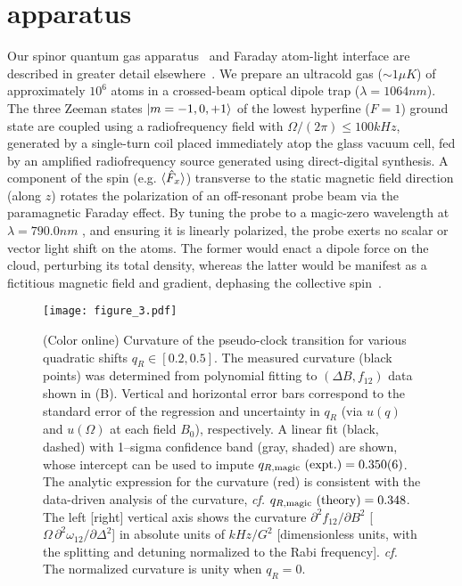 \documentclass[aps,prl,reprint,superscriptaddress,floatfix]{revtex4-1}
\begin{document}
\section{apparatus}
\label{sec:apparatus}
Our spinor quantum gas apparatus~\cite{wood_magnetic_2015} and Faraday atom-light interface are described in greater detail elsewhere~\cite{martijn_faraday_2017}.
We prepare an ultracold gas ($\sim1\unit{\mu K}$) of approximately $10^6$ \Rb atoms in a crossed-beam optical dipole trap ($\lambda=1064\unit{nm}$).
The three Zeeman states $\vert m=-1,0,+1 \rangle $ of the lowest hyperfine ($F=1$) ground state are coupled using a radiofrequency field with $\Omega/(2\pi) \leq 100\unit{kHz}$, generated by a single-turn coil placed immediately atop the glass vacuum cell, fed by an amplified radiofrequency source generated using direct-digital synthesis.
A component of the spin (e.g. $\langle \hat{F}_x \rangle$) transverse to the static magnetic field direction (along $z$) rotates the polarization of an off-resonant probe beam via the paramagnetic Faraday effect.
By tuning the probe to a magic-zero wavelength at $\lambda = 790.0\unit{nm}$ 
, and ensuring it is linearly polarized, the probe exerts no scalar or vector light shift on the atoms.
The former would enact a dipole force on the cloud, perturbing its total density, whereas the latter would be manifest as a fictitious magnetic field and gradient, dephasing the collective spin~\cite{wood_measurement_2016}.
\

\begin{figure}
    \centering
    \texttt{[image: figure\_3.pdf]}
    \caption{
    \label{fig:curvature_vs_qR}
        (Color online)
        Curvature of the pseudo-clock transition for various quadratic shifts $q_R \in [0.2, 0.5]$.
        The measured curvature (black points) was determined from polynomial fitting to $(\Delta B, f_{12})$ data shown in (B).
        Vertical and horizontal error bars correspond to the standard error of the regression and uncertainty in $q_R$ (via $u(q)$ and $u(\Omega)$ at each field $B_0$), respectively.
        A linear fit (black, dashed) with 1--sigma confidence band (gray, shaded) are shown, whose intercept can be used to impute $q_{R,\text{magic}}\text{ (expt.)} = 0.350(6)$.
        The analytic expression for the curvature (red) is consistent with the data-driven analysis of the curvature, \emph{cf.} $q_{R,\text{magic}}\text{ (theory)} = 0.348$.
        The left [right] vertical axis shows the curvature $\partial^2 f_{12}/\partial B^2$ [$\Omega\, \partial^2\omega_{12}/\partial \Delta^2$] in absolute units of $\unit{kHz/G^2}$ [dimensionless units, with the splitting and detuning normalized to the Rabi frequency].
      \emph{cf.} The normalized curvature is unity when $q_R=0$.
    }
\end{figure}
\end{document}
